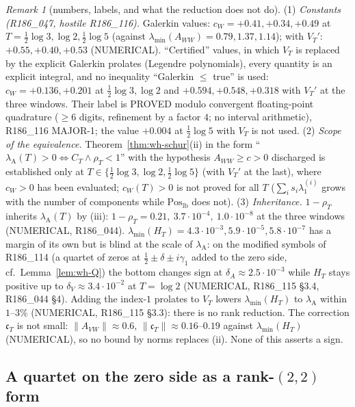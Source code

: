 \documentclass[11pt]{amsart}
\theoremstyle{definition}
\theoremstyle{remark}
\newtheorem{remark}[theorem]{Remark}
\begin{document}
\begin{remark}[numbers, labels, and what the reduction does not do]\label{rem:wh-LWnum}
(1) \emph{Constants (R186\_047, hostile R186\_116).} Galerkin values: $c_W=+0.41,+0.34,+0.49$ at
$T=\frac12\log3,\log2,\frac12\log5$ (against $\lambda_{\min}(A_{WW})=0.79,1.37,1.14$); with $V_T'$: $+0.55,+0.40,+0.53$
(NUMERICAL). ``Certified'' values, in which $V_T$ is replaced by the explicit Galerkin prolates (Legendre
polynomials), every quantity is an explicit integral, and no inequality ``Galerkin $\le$ true'' is used:
$c_W=+0.136,+0.201$ at $\frac12\log3,\log2$ and $+0.594,+0.548,+0.318$ with $V_T'$ at the three windows.
Their label is PROVED modulo convergent floating-point quadrature ($\ge6$ digits, refinement by a factor $4$;
no interval arithmetic), R186\_116 MAJOR-1; the value $+0.004$ at $\frac12\log5$ with $V_T$ is not used.
(2) \emph{Scope of the equivalence.} Theorem~\ref{thm:wh-schur}(ii) in the form
``$\lambda_{\mathrm A}(T)>0\iff C_T\wedge\rho_T<1$'' with the hypothesis $A_{WW}\ge c>0$ discharged is established only at
$T\in\{\frac12\log3,\log2,\frac12\log5\}$ (with $V_T'$ at the last), where $c_W>0$ has been evaluated; $c_W(T)>0$ is not
proved for all $T$ ($\sum_is_i\lambda_1^{(i)}$ grows with the number of components while $\mathrm{Pos}_{\mathrm{lb}}$ does not).
(3) \emph{Inheritance.} $1-\rho_T$ inherits $\lambda_{\mathrm A}(T)$ by (iii): $1-\rho_T=0.21,\ 3.7\cdot10^{-4},\ 1.0\cdot10^{-8}$
at the three windows (NUMERICAL, R186\_044). $\lambda_{\min}(H_T)=4.3\cdot10^{-3},5.9\cdot10^{-5},5.8\cdot10^{-7}$ has a margin of its
own but is blind at the scale of $\lambda_{\mathrm A}$: on the modified symbols of R186\_114 (a quartet of zeros at
$\frac12\pm\delta\pm i\gamma_1$ added to the zero side, cf.\ Lemma~\ref{lem:wh-Q}) the bottom changes sign at
$\delta_A\approx2.5\cdot10^{-3}$ while $H_T$ stays positive up to $\delta_V\approx3.4\cdot10^{-2}$ at $T=\log2$ (NUMERICAL,
R186\_115 \S3.4, R186\_044 \S4). Adding the index-$1$ prolates to $V_T$ lowers $\lambda_{\min}(H_T)$ to $\lambda_{\mathrm A}$ within
$1$--$3\%$ (NUMERICAL, R186\_115 \S3.3): there is no rank reduction. The correction $\mathfrak c_T$ is not small:
$\|A_{VW}\|\approx0.6$, $\|\mathfrak c_T\|\approx0.16$--$0.19$ against $\lambda_{\min}(H_T)$ (NUMERICAL), so no bound by norms
replaces (ii). None of this asserts a sign.
\end{remark}

\subsection{A quartet on the zero side as a rank-$(2,2)$ form}\label{subsec:wh-quartet}
\end{document}
